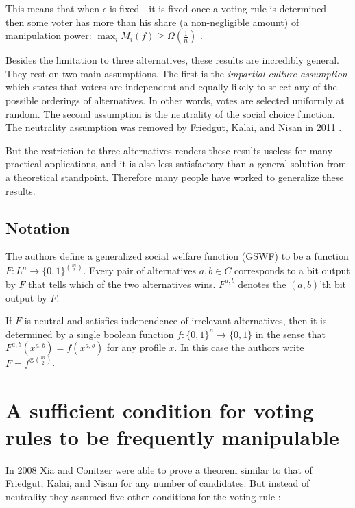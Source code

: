 	This means that when $\epsilon$ is fixed---it is fixed once a voting rule is determined---then some voter has more than his share (a non-negligible amount) of manipulation power: $\max_i M_i(f) \ge \Omega(\frac{1}{n})$ \cite{friedgut2008elections}.

	Besides the limitation to three alternatives, these results are incredibly general. They rest on two main assumptions. The first is the \emph{impartial culture assumption} which states that voters are independent and equally likely to select any of the possible orderings of alternatives. In other words, votes are selected uniformly at random. The second assumption is the neutrality of the social choice function. The neutrality assumption was removed by Friedgut, Kalai, and Nisan in 2011 \cite{friedgut2011quantitative}.

	But the restriction to three alternatives renders these results useless for many practical applications, and it is also less satisfactory than a general solution from a theoretical standpoint. Therefore many people have worked to generalize these results.


\subsection{Notation}
\label{related-friedgut-notation}

	The authors define a generalized social welfare function (GSWF) to be a function $F : L^n \rightarrow \{0, 1\}^{\binom{m}{2}}$. Every pair of alternatives $a, b \in C$ corresponds to a bit output by $F$ that tells which of the two alternatives wins. $F^{a,b}$ denotes the $(a, b)$'th bit output by $F$.

	If $F$ is neutral and satisfies independence of irrelevant alternatives, then it is determined by a single boolean function $f : \{0, 1\}^n \rightarrow \{0, 1\}$ in the sense that $F^{a,b}(x^{a,b}) = f(x^{a,b})$ for any profile $x$. In this case the authors write $F = f^{\otimes \binom{m}{2}}$.


\section{A sufficient condition for voting rules to be frequently manipulable}

	In 2008 Xia and Conitzer were able to prove a theorem similar to that of Friedgut, Kalai, and Nisan for any number of candidates. But instead of neutrality they assumed five other conditions for the voting rule \cite{xia2008sufficient}:

